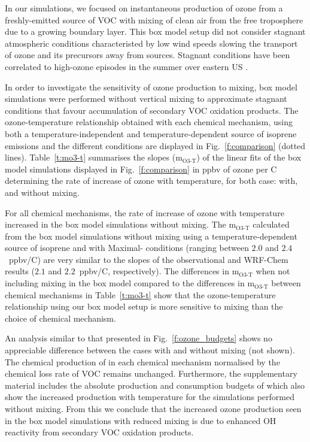 In our simulations, we focused on instantaneous production of ozone from a freshly-emitted source of VOC with mixing of clean air from the free troposphere due to a growing boundary layer.
This box model setup did not consider stagnant atmospheric conditions characteristed by low wind speeds slowing the transport of ozone and its precursors away from sources.
Stagnant conditions have been correlated to high-ozone episodes in the summer over eastern US \citep{Jacob:1993}.

In order to investigate the sensitivity of ozone production to mixing, box model simulations were performed without vertical mixing to approximate stagnant conditions that favour accumulation of secondary VOC oxidation products.
The ozone-temperature relationship obtained with each chemical mechanism, using both a temperature-independent and temperature-dependent source of isoprene emissions and the different  conditions are displayed in Fig.~\ref{f:comparison} (dotted lines).
Table~\ref{t:mo3-t} summarises the slopes (m$_{\text{O3-T}}$) of the linear fits of the box model simulations displayed in Fig.~\ref{f:comparison} in ppbv of ozone per \degree C determining the rate of increase of ozone with temperature, for both case: with, and without mixing.

For all chemical mechanisms, the rate of increase of ozone with temperature increased in the box model simulations without mixing.
The m$_{\text{O3-T}}$ calculated from the box model simulations without mixing using a temperature-dependent source of isoprene and with Maximal- conditions (ranging between $2.0$ and $2.4$~ppbv/\degree C) are very similar to the slopes of the observational and WRF-Chem results ($2.1$ and $2.2$~ppbv/\degree C, respectively).
The differences in m$_{\text{O3-T}}$ when not including mixing in the box model compared to the differences in m$_{\text{O3-T}}$ between chemical mechanisms in Table~\ref{t:mo3-t} show that the ozone-temperature relationship using our box model setup is more sensitive to mixing than the choice of chemical mechanism.

An analysis similar to that presented in Fig.~\ref{f:ozone_budgets} shows no appreciable difference between the cases with and without mixing (not shown).
The chemical production of  in each chemical mechanism normalised by the chemical loss rate of VOC remains unchanged. 
Furthermore, the supplementary material includes the absolute production and consumption budgets of  which also show the increased  production with temperature for the simulations performed without mixing.
From this we conclude that the increased ozone production seen in the box model simulations with reduced mixing is due to enhanced OH reactivity from secondary VOC oxidation products.
